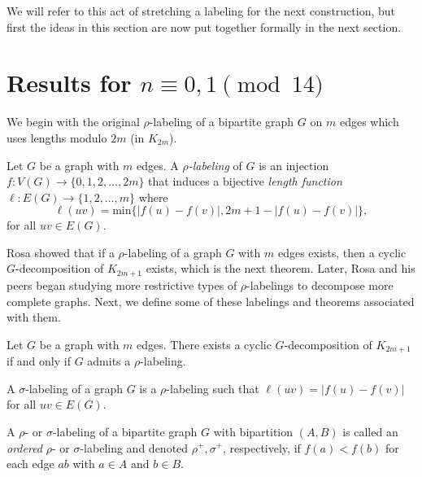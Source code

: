   We will refer to this act of stretching a labeling for the next construction, but first the ideas in this section are now put together formally in the next section.
\section{Results for $n\equiv 0,1 \pmod{14}$}\label{sec:0,1results}

We begin with the original $\rho$-labeling of a bipartite graph $G$ on $m$ edges which uses lengths modulo $2m$ (in $K_{2m}$). 

\begin{definition} \label{def:rho} 
 Let $G$ be a graph with $m$ edges.  A \textit{$\rho$-labeling} of $G$ is an injection $f: V(G) \rightarrow \{0,1,2, \dots, 2m\}$ that induces a bijective \textit{length function $\ell: E(G) \rightarrow \{1,2, \dots, m\}$} where 
    $$
    \ell(uv) = \text{min}\{|f(u)-f(v)|,2m+1-|f(u)-f(v)|\},
    $$
for all  $uv \in E(G)$.
\end{definition}

Rosa showed that if a $\rho$-labeling of a graph $G$ with $m$ edges exists, then a cyclic $G$-decomposition of $K_{2m+1}$ exists, which is the next theorem. Later, Rosa and his peers began studying more restrictive types of $\rho$-labelings to decompose more complete graphs. Next, we define some of these labelings and theorems associated with them.

\begin{thm}\label{thm:Rhosa}  
Let $G$ be a graph with $m$ edges.  There exists a cyclic $G$-decomposition of $K_{2m+1}$ if and only if $G$ admits a $\rho$-labeling.
\end{thm}

\begin{definition} \label{def:sigma} 
A $\sigma$-labeling of a graph $G$ is a $\rho$-labeling such that $\ell(uv) = |f(u) - f(v)|$ for all $uv \in E(G).$
\end{definition}

\begin{definition} \label{def:rho and sigma ordered def} 
A $\rho$- or $\sigma$-labeling of a bipartite graph $G$ with bipartition $(A,B)$ is called an \emph{ordered} $\rho$- or $\sigma$-labeling and denoted $\rho^+,\sigma^+$, respectively, if $f(a) < f(b)$ for each edge $ab$ with $a \in A$ and $b \in B$.
\end{definition}

